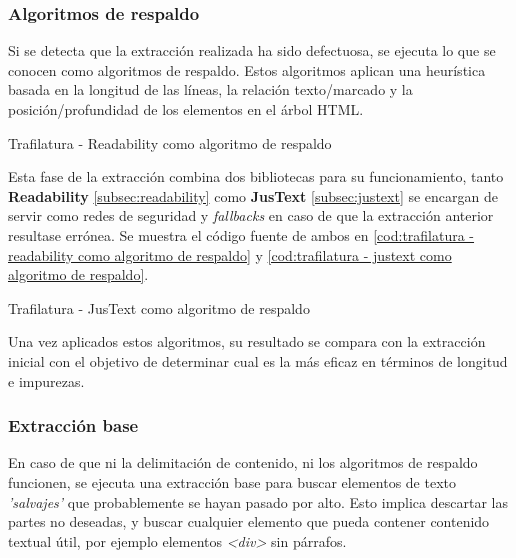 \subsubsection{Algoritmos de respaldo}
\label{subsubsec:algoritmos de respaldo}

Si se detecta que la extracción realizada ha sido defectuosa, se ejecuta lo que se conocen como algoritmos 
de respaldo. Estos algoritmos aplican una heurística basada en la longitud de las líneas, la relación 
texto/marcado y la posición/profundidad de los elementos en el árbol HTML.

\begin{codefloat}
  
  \caption{Trafilatura - Readability como algoritmo de respaldo}
  \label{cod:trafilatura - readability como algoritmo de respaldo}
\end{codefloat}

Esta fase de la extracción combina dos bibliotecas para su funcionamiento, tanto \textbf{Readability}
\ref{subsec:readability} como \textbf{JusText} \ref{subsec:justext} se encargan de servir como redes de
seguridad y \emph{fallbacks} en caso de que la extracción anterior resultase errónea. Se muestra el código 
fuente de ambos en \ref{cod:trafilatura - readability como algoritmo de respaldo} y 
\ref{cod:trafilatura - justext como algoritmo de respaldo}.

\begin{codefloat}
  
  \caption{Trafilatura - JusText como algoritmo de respaldo}
  \label{cod:trafilatura - justext como algoritmo de respaldo}
\end{codefloat}

Una vez aplicados estos algoritmos, su resultado se compara con la extracción inicial con el objetivo de 
determinar cual es la más eficaz en términos de longitud e impurezas.

\subsubsection{Extracción base}
\label{subsubsec:extraccion base}

En caso de que ni la delimitación de contenido, ni los algoritmos de respaldo funcionen, se ejecuta una
extracción base para buscar elementos de texto \emph{'salvajes'} que probablemente se hayan pasado por alto.
Esto implica descartar las partes no deseadas, y buscar cualquier elemento que pueda contener contenido
textual útil, por ejemplo elementos \emph{<div>} sin párrafos.

